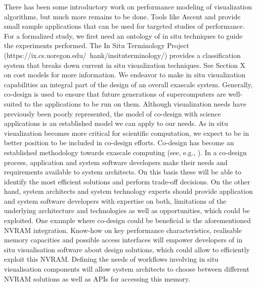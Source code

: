 \begin{refsection}
There has been some introductory work on performance modeling of visualization algorithms, but much more remains to be done. Tools like Ascent \cite{LA*H17} and \cite{SENSEI} provide small sample applications that can be used for targeted studies of performance. For a formalized study, we first need an ontology of in situ techniques to guide the experiments performed. The In Situ Terminology Project (https://ix.cs.uoregon.edu/~hank/insituterminology/) provides a classification system that breaks down current in situ visualization techniques. See Section X on cost models for more information.
We endeavor to make in situ visualization capabilities an integral part of the design of an overall exascale system. Generally, co-design is used to ensure that future generations of supercomputers are well-suited to the applications to be run on them. Although visualization needs have previously been poorly represented, the model of co-design with science applications is an established model we can apply to our needs. As in situ visualization becomes more critical for scientific computation, we expect to be in better position to be included in co-design efforts. Co-design has become an established methodology towards exascale computing (see, e.g., \cite{Barrett13}). In a co-design process, application and system software developers make their needs and requirements available to system architects. On this basis these will be able to identify the most efficient solutions and perform trade-off decisions. On the other hand, system architects and system technology experts should provide application and system software developers with expertise on both, limitations of the underlying architecture and technologies as well as opportunities, which could be exploited. 
One example where co-design could be beneficial is the aforementioned NVRAM integration. Know-how on key performance characteristics, realisable memory capacities and possible access interfaces will empower developers of in situ visualisation software about design solutions, which could allow to efficiently exploit this NVRAM. Defining the needs of workflows involving in situ visualisation components will allow system architects to choose between different NVRAM solutions as well as APIs for accessing this memory.


\end{refsection}
